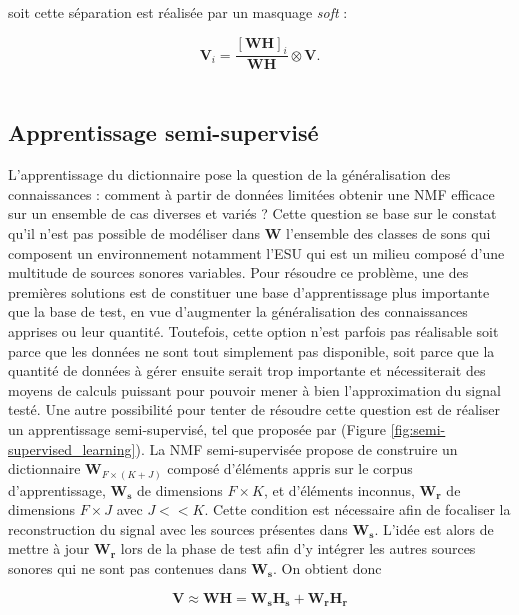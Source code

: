 soit cette séparation est réalisée par un masquage \textit{soft} :

\begin{equation}
\mathbf{V}_i = \frac{\left[\mathbf{WH}\right]_i}{\mathbf{WH}} \otimes \mathbf{V}.
\end{equation}
\\

\subsection{Apprentissage semi-supervisé}
L'apprentissage du dictionnaire pose la question de la généralisation des connaissances : comment à partir de données limitées obtenir une NMF efficace sur un ensemble de cas diverses et variés ?  Cette question se base sur le constat qu'il n'est pas possible de modéliser dans $\mathbf{W}$ l'ensemble des classes de sons qui composent un environnement notamment l'ESU qui est un milieu composé d'une multitude de sources sonores variables. Pour résoudre ce problème, une des premières solutions est de constituer une base d'apprentissage plus importante que la base de test, en vue d'augmenter la généralisation des connaissances apprises ou leur quantité. Toutefois, cette option n'est parfois pas réalisable soit parce que les données ne sont tout simplement pas disponible, soit parce que la quantité de données à gérer ensuite serait trop importante et nécessiterait des moyens de calculs puissant pour pouvoir mener à bien l'approximation du signal testé.
Une autre possibilité pour tenter de résoudre cette question est de réaliser un apprentissage semi-supervisé, tel que proposée par \cite{lee_semi-supervised_2010, smaragdis2007supervised} (Figure \ref{fig:semi-supervised_learning}). La NMF semi-supervisée propose de construire un dictionnaire $\mathbf{W}_{F \times (K+J)}$ composé d'éléments appris sur le corpus d'apprentissage, $\mathbf{W_s} $ de dimensions $F \times K$, et d'éléments inconnus, $\mathbf{W_r}$ de dimensions $F \times J$ avec $J << K$. Cette condition est nécessaire afin de focaliser la reconstruction du signal avec les sources présentes dans $\mathbf{W_s}$. L'idée est alors de mettre à jour $\mathbf{W_r}$ lors de la phase de test afin d'y intégrer les autres sources sonores qui ne sont pas contenues dans $\mathbf{W_s}$. On obtient donc

\begin{equation}
\mathbf{V} \approx \mathbf{WH} = \mathbf{W_s} \mathbf{H_s} + \mathbf{W_r} \mathbf{H_r}
\end{equation}


